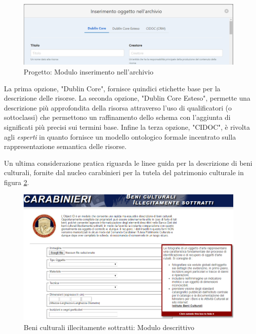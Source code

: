 \begin{figure}[H]
\centering
\includegraphics[width=1\textwidth]{immagini/inserimentoArchivio.PNG}
\caption{Progetto: Modulo inserimento nell'archivio}
\label{fig:progettoInserimento}
\end{figure}

La prima opzione, "Dublin Core", fornisce quindici etichette base per la descrizione delle risorse. La seconda opzione, "Dublin Core Esteso", permette una descrizione più approfondita della risorsa attraverso l'uso di qualificatori (o sottoclassi) che permettono un raffinamento dello schema con l'aggiunta di significati più precisi sui termini base. Infine la terza opzione, "CIDOC", è rivolta agli \emph{esperti} in quanto fornisce un modello ontologico formale incentrato sulla rappresentazione semantica delle risorse.

Un ultima considerazione pratica riguarda le linee guida per la descrizione di beni culturali, fornite dal nucleo carabinieri per la tutela del patrimonio culturale in figura \ref{fig:carabinieriTPC}.

\begin{figure}[H]
\centering
\includegraphics[width=1\textwidth]{immagini/carabinieriTPC2.png}
\caption{Beni culturali illecitamente sottratti: Modulo descrittivo}
\label{fig:carabinieriTPC}
\end{figure}

